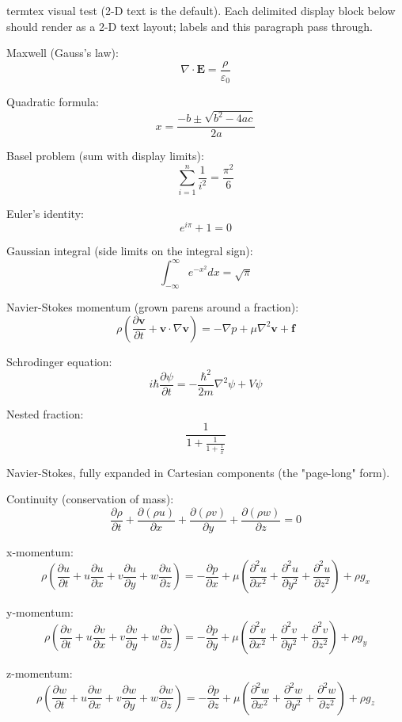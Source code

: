 termtex visual test (2-D text is the default). Each delimited display block below
should render as a 2-D text layout; labels and this paragraph pass through.

Maxwell (Gauss's law):
\[ \nabla \cdot \mathbf{E} = \frac{\rho}{\varepsilon_0} \]

Quadratic formula:
\[ x = \frac{-b \pm \sqrt{b^2 - 4ac}}{2a} \]

Basel problem (sum with display limits):
\[ \sum_{i=1}^{n} \frac{1}{i^2} = \frac{\pi^2}{6} \]

Euler's identity:
\[ e^{i \pi} + 1 = 0 \]

Gaussian integral (side limits on the integral sign):
\[ \int_{-\infty}^{\infty} e^{-x^2} dx = \sqrt{\pi} \]

Navier-Stokes momentum (grown parens around a fraction):
\[ \rho \left( \frac{\partial \mathbf{v}}{\partial t} + \mathbf{v} \cdot \nabla \mathbf{v} \right) = -\nabla p + \mu \nabla^2 \mathbf{v} + \mathbf{f} \]

Schrodinger equation:
\[ i \hbar \frac{\partial \psi}{\partial t} = -\frac{\hbar^2}{2m} \nabla^2 \psi + V \psi \]

Nested fraction:
\[ \frac{1}{1 + \frac{1}{1 + \frac{1}{x}}} \]

Navier-Stokes, fully expanded in Cartesian components (the "page-long" form).

Continuity (conservation of mass):
\[ \frac{\partial \rho}{\partial t} + \frac{\partial (\rho u)}{\partial x} + \frac{\partial (\rho v)}{\partial y} + \frac{\partial (\rho w)}{\partial z} = 0 \]

x-momentum:
\[ \rho \left( \frac{\partial u}{\partial t} + u \frac{\partial u}{\partial x} + v \frac{\partial u}{\partial y} + w \frac{\partial u}{\partial z} \right) = -\frac{\partial p}{\partial x} + \mu \left( \frac{\partial^2 u}{\partial x^2} + \frac{\partial^2 u}{\partial y^2} + \frac{\partial^2 u}{\partial z^2} \right) + \rho g_x \]

y-momentum:
\[ \rho \left( \frac{\partial v}{\partial t} + u \frac{\partial v}{\partial x} + v \frac{\partial v}{\partial y} + w \frac{\partial v}{\partial z} \right) = -\frac{\partial p}{\partial y} + \mu \left( \frac{\partial^2 v}{\partial x^2} + \frac{\partial^2 v}{\partial y^2} + \frac{\partial^2 v}{\partial z^2} \right) + \rho g_y \]

z-momentum:
\[ \rho \left( \frac{\partial w}{\partial t} + u \frac{\partial w}{\partial x} + v \frac{\partial w}{\partial y} + w \frac{\partial w}{\partial z} \right) = -\frac{\partial p}{\partial z} + \mu \left( \frac{\partial^2 w}{\partial x^2} + \frac{\partial^2 w}{\partial y^2} + \frac{\partial^2 w}{\partial z^2} \right) + \rho g_z \]

